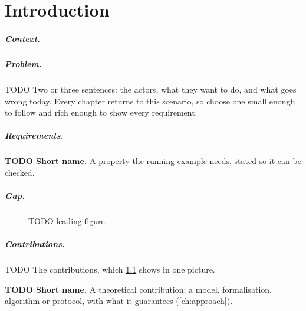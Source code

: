 \chapter{Introduction}\label{ch:intro}

\paragraph{Context.}\label{par:context}

\paragraph{Problem.}\label{par:problem}
\begin{runningexample}
TODO Two or three sentences: the actors, what they want to do, and what goes wrong today. Every chapter returns to this scenario, so choose one small enough to follow and rich enough to show every requirement.
\end{runningexample}

\paragraph{Requirements.}
\begin{requirements}
  \item\label{req:first} \textbf{TODO Short name.} A property the running example needs, stated so it can be checked.
\end{requirements}

\paragraph{Gap.}\label{par:gap}

\begin{figure}[!ht]
  \centering
  \caption{TODO leading figure.}
  \label{fig:overview}
\end{figure}

\paragraph{Contributions.}
TODO The contributions, which \cref{fig:overview} shows in one picture.
\begin{contributions}
  \item\label{c:method} \textbf{TODO Short name.} A theoretical contribution: a model, formalisation, algorithm or protocol, with what it guarantees (\cref{ch:approach}).
\end{contributions}

